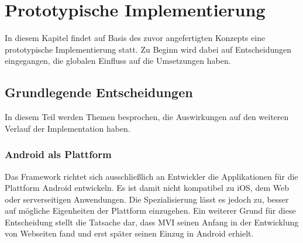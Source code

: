 \section{Prototypische Implementierung}
\label{sec:prototypische-implementierungt}
In diesem Kapitel findet auf Basis des zuvor angefertigten Konzepts eine prototypische Implementierung statt. Zu Beginn wird dabei auf Entscheidungen eingegangen, die globalen Einfluss auf die Umsetzungen haben.

\subsection{Grundlegende Entscheidungen}
In diesem Teil werden Themen besprochen, die Auswirkungen auf den weiteren Verlauf der Implementation haben.

\subsubsection{Android als Plattform}
Das Framework richtet sich ausschließlich an Entwickler die Applikationen für die Plattform Android entwickeln. Es ist damit nicht kompatibel zu iOS, dem Web oder serverseitigen Anwendungen. Die Spezialisierung lässt es jedoch zu, besser auf mögliche Eigenheiten der Plattform einzugehen. Ein weiterer Grund für diese Entscheidung stellt die Tatsache dar, dass MVI seinen Anfang in der Entwicklung von Webseiten fand und erst später seinen Einzug in Android erhielt.

